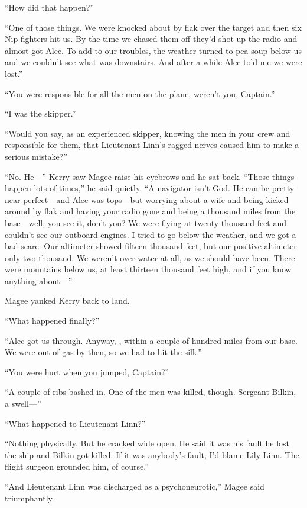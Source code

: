 \documentclass{novel}
\begin{document}
“How did that happen?”

“One of those things. We were knocked about by flak over the target and then six Nip fighters hit us. By the time we chased them off they’d shot up the radio and almost got Alec. To add to our troubles, the weather turned to pea soup below us and we couldn’t see what was downstairs. And after a while Alec told me we were lost.”

“You were responsible for all the men on the plane, weren’t you, Captain.”

“I was the skipper.”

“Would you say, as an experienced skipper, knowing the men in your crew and responsible for them, that Lieutenant Linn’s ragged nerves caused him to make a serious mistake?”

“No. He—” Kerry saw Magee raise his eyebrows and he sat back. “Those things happen lots of times,” he said quietly. “A navigator isn’t God. He can be pretty near perfect—and Alec was tops—but worrying about a wife and being kicked around by flak and having your radio gone and being a thousand miles from the base—well, you see it, don’t you? We were flying at twenty thousand feet and couldn’t see our outboard engines. I tried to go below the weather, and we got a bad scare. Our altimeter showed fifteen thousand feet, but our positive altimeter only two thousand. We weren’t over water at all, as we should have been. There were mountains below us, at least thirteen thousand feet high, and if you know anything about—”

\scenestars

Magee yanked Kerry back to land.

“What happened finally?”

“Alec got us through. Anyway, , within a couple of hundred miles from our base. We were out of gas by then, so we had to hit the silk.”

“You were hurt when you jumped, Captain?”

“A couple of ribs bashed in. One of the men was killed, though. Sergeant Bilkin, a swell—”

“What happened to Lieutenant Linn?”

“Nothing physically. But he cracked wide open. He said it was his fault he lost the ship and Bilkin got killed. If it was anybody’s fault, I’d blame Lily Linn. The flight surgeon grounded him, of course.”

“And Lieutenant Linn was discharged as a psychoneurotic,” Magee said triumphantly.
\end{document}
